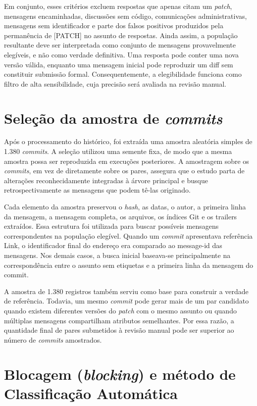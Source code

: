 Em conjunto, esses critérios excluem respostas que apenas citam um \textit{patch}, mensagens encaminhadas, discussões sem código, comunicações administrativas, mensagens sem identificador e parte dos falsos positivos produzidos pela permanência de [PATCH] no assunto de respostas. Ainda assim, a população resultante deve ser interpretada como conjunto de mensagens provavelmente elegíveis, e não como verdade definitiva. Uma resposta pode conter uma nova versão válida, enquanto uma mensagem inicial pode reproduzir um diff sem constituir submissão formal. Consequentemente, a elegibilidade funciona como filtro de alta sensibilidade, cuja precisão será avaliada na revisão manual.

\section{Seleção da amostra de \textit{commits}}
Após o processamento do histórico, foi extraída uma amostra aleatória simples de 1.380 \textit{commits}. A seleção utilizou uma semente fixa, de modo que a mesma amostra possa ser reproduzida em execuções posteriores. A amostragem sobre os \textit{commits}, em vez de diretamente sobre os pares, assegura que o estudo parta de alterações reconhecidamente integradas à árvore principal e busque retrospectivamente as mensagens que podem tê-las originado.

Cada elemento da amostra preservou o \textit{hash}, as datas, o autor, a primeira linha da mensagem, a mensagem completa, os arquivos, os índices Git e os trailers extraídos. Essa estrutura foi utilizada para buscar possíveis mensagens correspondentes na população elegível. Quando um \textit{commit} apresentava referência Link, o identificador final do endereço era comparado ao message-id das mensagens. Nos demais casos, a busca inicial baseava-se principalmente na correspondência entre o assunto sem etiquetas e a primeira linha da mensagem do commit.

A amostra de 1.380 registros também serviu como base para construir a verdade de referência. Todavia, um mesmo \textit{commit} pode gerar mais de um par candidato quando existem diferentes versões do \textit{patch} com o mesmo assunto ou quando múltiplas mensagens compartilham atributos semelhantes. Por essa razão, a quantidade final de pares submetidos à revisão manual pode ser superior ao número de \textit{commits} amostrados.

\section{Blocagem (\textit{blocking}) e método de Classificação Automática}

